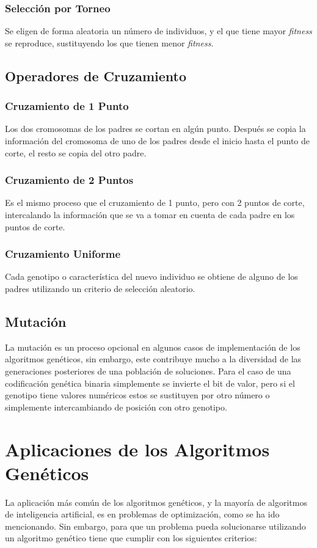\documentclass[a4paper, 12pt]{article}
\begin{document}
\subsubsection{Selección por Torneo}
Se eligen de forma aleatoria un número de individuos, y el que tiene mayor \emph{fitness} se reproduce, sustituyendo los que tienen menor \emph{fitness}.

\subsection{Operadores de Cruzamiento}
\subsubsection{Cruzamiento de 1 Punto}
Los dos cromosomas de los padres se cortan en algún punto. Después se copia la información del cromosoma de uno de los padres desde el inicio hasta el punto de corte, el resto se copia del otro padre.

\subsubsection{Cruzamiento de 2 Puntos}
Es el mismo proceso que el cruzamiento de 1 punto, pero con 2 puntos de corte, intercalando la información que se va a tomar en cuenta de cada padre en los puntos de corte.

\subsubsection{Cruzamiento Uniforme}
Cada genotipo o característica del nuevo individuo se obtiene de alguno de los padres utilizando un criterio de selección aleatorio.

\subsection{Mutación}
La mutación es un proceso opcional en algunos casos de implementación de los algoritmos genéticos, sin embargo, este contribuye mucho a la diversidad de las generaciones posteriores de una población de soluciones. Para el caso de una codificación genética binaria simplemente se invierte el bit de valor, pero si el genotipo tiene valores numéricos estos se sustituyen por otro número o simplemente intercambiando de posición con otro genotipo.

\section{Aplicaciones de los Algoritmos Genéticos}
La aplicación más común de los algoritmos genéticos, y la mayoría de algoritmos de inteligencia artificial, es en problemas de optimización, como se ha ido mencionando. Sin embargo, para que un problema pueda solucionarse utilizando un algoritmo genético tiene que cumplir con los siguientes criterios:
\end{document}
